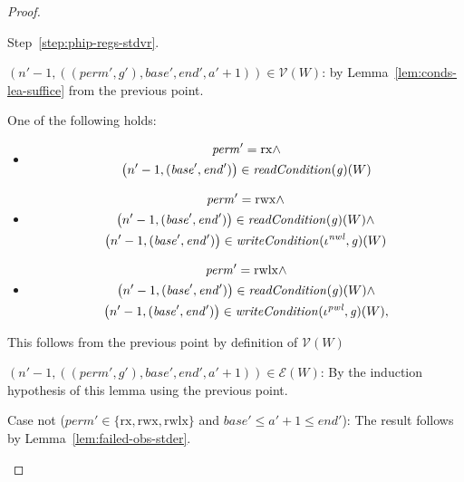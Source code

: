 \documentclass[a4paper]{article}
\newcommand{\var}[1]{\mathit{#1}}
\newcommand{\gl}{\var{g}}
\newcommand{\addr}{\var{a}}
\newcommand{\start}{\var{base}}
\newcommand{\addrend}{\var{end}}
\newcommand{\perm}{\var{perm}}
\newcommand{\nwl}{\var{nwl}}
\newcommand{\pwl}{\var{pwl}}
\newcommand{\plainfun}[2]{
  \ifthenelse{\equal{#2}{}}
  {\mathit{#1}}
  {\mathit{#1}(#2)}
}
\newcommand{\readCond}[1]{\plainfun{readCondition}{#1}}
\newcommand{\writeCond}[1]{\plainfun{writeCondition}{#1}}
\newcommand{\asmType}{\plaindom{AsmType}}
\newcommand{\plaindom}[1]{\mathrm{#1}}
\newcommand{\intr}[2]{\mathcal{#1}}
\newcommand{\valueintr}[1]{\intr{V}{#1}}
\newcommand{\exprintr}[1]{\intr{E}{#1}}
\newcommand{\stdvr}{\valueintr{\asmType}}
\newcommand{\stder}{\exprintr{\asmType}}
\newcommand{\npair}[2][n]{\left(#1,#2 \right)}
\newcommand{\plainperm}[1]{\mathrm{#1}}
\newcommand{\exec}{\plainperm{rx}}
\newcommand{\rwx}{\plainperm{rwx}}
\newcommand{\rwlx}{\plainperm{rwlx}}
\begin{document}
\begin{proof}
\begin{enumproof}
\begin{enumproof}
\begin{enumproof}
\begin{enumproof}
\begin{enumproof}
            Step~\ref{step:phip-regs-stdvr}.
          \item $\npair[n'-1]{((\perm',\gl'),\start',\addrend',\addr' + 1)} \in \stdvr(W)$: by
            Lemma~\ref{lem:conds-lea-suffice} from the previous point.
          \item One of the following holds:
            \begin{itemize}
            \item \[
                \begin{gathered}
                  \perm' = \exec \land\\
                  \npair[n'-1]{(\start',\addrend')} \in \readCond{}(\gl)(W)
                \end{gathered}
              \]
            \item \[
                \begin{gathered}
                  \perm' = \rwx \land \\
                  \npair[n'-1]{(\start',\addrend')} \in \readCond{}(\gl)(W) \land\\
                  \npair[n'-1]{(\start',\addrend')} \in \writeCond{}(\iota^\nwl,\gl)(W)
                \end{gathered}
              \]
            \item \[
                \begin{gathered}
                  \perm' = \rwlx \land\\
                  \npair[n'-1]{(\start',\addrend')} \in \readCond{}(\gl)(W) \land\\
                  \npair[n'-1]{(\start',\addrend')} \in \writeCond{}(\iota^\pwl,\gl)(W),
                \end{gathered}
              \]
            \end{itemize}
           This follows from the previous point by  definition of $\stdvr(W)$
         \item $\npair[n'-1]{((\perm',\gl'),\start',\addrend',\addr' + 1)} \in
           \stder(W)$: By the induction hypothesis of this lemma using the
           previous point.
          \end{enumproof}
        \item Case not ($\perm' \in \{\exec,\rwx,\rwlx\}$ and $\start'\leq
          \addr'+1\leq \addrend'$):
          The result follows by Lemma~\ref{lem:failed-obs-stder}.
        \end{enumproof}
      \end{enumproof}
    \item

\end{enumproof}
\end{enumproof}
\end{proof}
\end{document}
